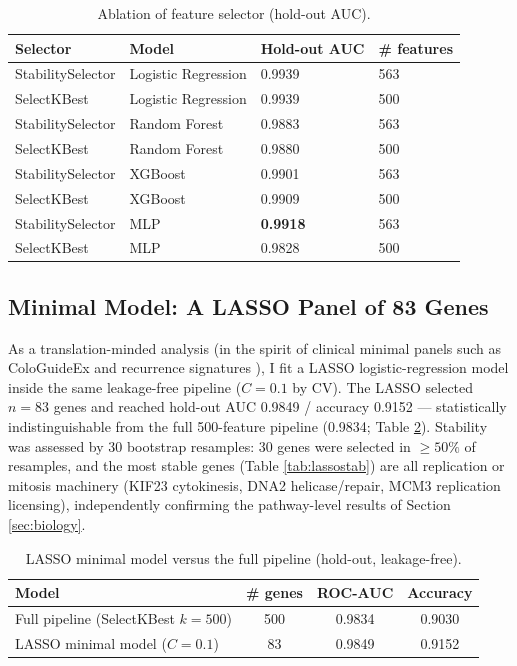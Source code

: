 \documentclass[12pt]{article}
\begin{document}
\begin{table}[htbp]
\centering
\caption{Ablation of feature selector (hold-out AUC).}
\label{tab:ablation}
\begin{tabular}{llll}
\toprule
\textbf{Selector} & \textbf{Model} & \textbf{Hold-out AUC} & \textbf{\# features} \\
\midrule
StabilitySelector & Logistic Regression & 0.9939 & 563 \\
SelectKBest & Logistic Regression & 0.9939 & 500 \\
StabilitySelector & Random Forest & 0.9883 & 563 \\
SelectKBest & Random Forest & 0.9880 & 500 \\
StabilitySelector & XGBoost & 0.9901 & 563 \\
SelectKBest & XGBoost & 0.9909 & 500 \\
StabilitySelector & MLP & \textbf{0.9918} & 563 \\
SelectKBest & MLP & 0.9828 & 500 \\
\bottomrule
\end{tabular}
\end{table}

\subsection{Minimal Model: A LASSO Panel of 83 Genes}
As a translation-minded analysis (in the spirit of clinical minimal panels such as ColoGuideEx \citep{agesen2012} and recurrence signatures \citep{oconnell2010}), I fit a LASSO logistic-regression model \citep{tibshirani1996} inside the same leakage-free pipeline ($C = 0.1$ by CV). The LASSO selected $n = 83$ genes and reached hold-out AUC 0.9849 / accuracy 0.9152 --- statistically indistinguishable from the full 500-feature pipeline (0.9834; Table \ref{tab:lasso}). Stability was assessed by 30 bootstrap resamples: 30 genes were selected in $\geq 50\%$ of resamples, and the most stable genes (Table \ref{tab:lassostab}) are all replication or mitosis machinery (KIF23 cytokinesis, DNA2 helicase/repair, MCM3 replication licensing), independently confirming the pathway-level results of Section \ref{sec:biology}.

\begin{table}[htbp]
\centering
\caption{LASSO minimal model versus the full pipeline (hold-out, leakage-free).}
\label{tab:lasso}
\begin{tabular}{lccc}
\toprule
\textbf{Model} & \textbf{\# genes} & \textbf{ROC-AUC} & \textbf{Accuracy} \\
\midrule
Full pipeline (SelectKBest $k=500$) & 500 & 0.9834 & 0.9030 \\
LASSO minimal model ($C=0.1$) & 83 & 0.9849 & 0.9152 \\
\bottomrule
\end{tabular}
\end{table}
\end{document}
